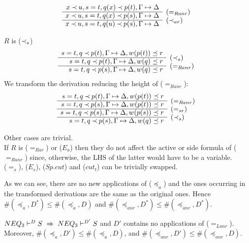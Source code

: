 \begin{PROOF}
\begin{LS}
\[\begin{array}{rl}
x\Incl u, s=t, q(x)\Incl p(t), \GSD \\ \cline{1-1}
x\Incl u, s=t, q(x)\Incl p(s), \GSD & \rabove{(=_{Ranr})} \\ \cline{1-1}
x\Incl u, s=t, q(u)\Incl p(s), \GSD & \rabove{(\Incl_{ar})} \end{array} \]
%
\item $R$ is ($\mathbin{\prec}_{s}$)
\[ \begin{array}{rl}
s=t, q\Incl p(t), \GSD, w(p(t))\preceq r \\ \cline{1-1}
s=t, q\Incl p(t), \GSD, w(q)\preceq r & \rabove{(\Incl_s)} \\ \cline{1-1}
s=t, q\Incl p(s), \GSD, w(q)\preceq r & \rabove{(=_{Ranr})} \end{array} \]
We transform the derivation reducing the height of ($=_{Ranr}$):
\[ \begin{array}{rl}
s=t, q\Incl p(t), \GSD, w(p(t))\preceq r \\ \cline{1-1}
s=t, q\Incl p(s), \GSD, w(p(t))\preceq r & \rabove{(=_{Ranr})} \\ \cline{1-1}
s=t, q\Incl p(s), \GSD, w(p(s))\preceq r & \rabove{(=_{sr})} \\ \cline{1-1}
s=t, q\Incl p(s), \GSD, w(q)\preceq r & \rabove{(\Incl_s)} \end{array} \]
%
\item Other cases are trivial. \\
If $R$ is ($=_{Rar}$) or ($E_a$) then they do not affect the active or side
formula of ($=_{Ranr}$) since, otherwise, the LHS of the latter would have to
be a variable. \\
 ($=_s$), ($E_s$), ($Sp.cut$) and ($cut_t$) can be trivially swapped.
\end{LS}
As we can see, there are no new applications of ($\preceq_a$) and the ones
occurring in the transformed derivations are the same as the original ones. 
Hence $\#(\preceq_a,D^*)\leq\#(\preceq_a,D)$ and $\#(\preceq_{anr},D^*)\leq
\#(\preceq_{anr},D^*)$.
\end{PROOF}
%
\begin{LEMMA}\label{le:noLanr}
 ${NEQ_3}\vdash^{{D}}S\ \mathrel\Rightarrow\ {NEQ_3}\vdash^{{D'}}S$ and $D'$ contains no
applications of ($=_{Lanr}$).
Moreover, $\#(\preceq_a,D')\leq\#(\preceq_a,D)$, and 
$\#(\preceq_{anr},D')\leq\#(\preceq_{anr},D)$.
\end{LEMMA}
